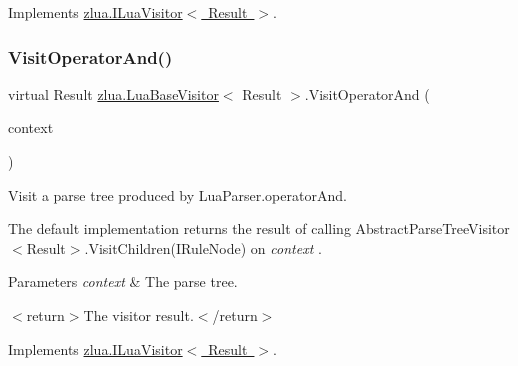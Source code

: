 Implements \mbox{\hyperlink{interfacezlua_1_1_i_lua_visitor_a530f85828f02eb15078b452db78726a0}{zlua.\+I\+Lua\+Visitor$<$ Result $>$}}.

\mbox{\label{classzlua_1_1_lua_base_visitor_ae38f8049b6998fcbc7cd6374bfe1538a}} 
\subsubsection{\texorpdfstring{Visit\+Operator\+And()}{VisitOperatorAnd()}}
{\footnotesize\ttfamily virtual Result \mbox{\hyperlink{classzlua_1_1_lua_base_visitor}{zlua.\+Lua\+Base\+Visitor}}$<$ Result $>$.Visit\+Operator\+And (\begin{DoxyParamCaption}\item[{\mbox{[}\+Not\+Null\mbox{]} \mbox{\hyperlink{classzlua_1_1_lua_parser_1_1_operator_and_context}{Lua\+Parser.\+Operator\+And\+Context}}}]{context }\end{DoxyParamCaption})\hspace{0.3cm}{\ttfamily [virtual]}}



Visit a parse tree produced by Lua\+Parser.\+operator\+And. 

The default implementation returns the result of calling Abstract\+Parse\+Tree\+Visitor$<$\+Result$>$.\+Visit\+Children(\+I\+Rule\+Node) on {\itshape context} . 


\begin{DoxyParams}{Parameters}
{\em context} & The parse tree.\\
\hline
\end{DoxyParams}
$<$return$>$The visitor result.$<$/return$>$ 

Implements \mbox{\hyperlink{interfacezlua_1_1_i_lua_visitor_a62f776e1b24d6689591045ba24af62a0}{zlua.\+I\+Lua\+Visitor$<$ Result $>$}}.

\mbox{\label{classzlua_1_1_lua_base_visitor_a024ddded01656d54d3819ca2f1e95e4e}} 
